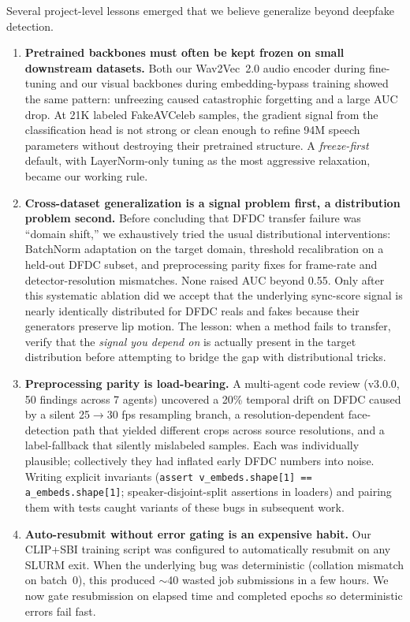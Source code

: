\documentclass[12pt, letterpaper]{article}
\begin{document}
Several project-level lessons emerged that we believe generalize beyond deepfake detection.

\begin{enumerate}[leftmargin=1.5em, itemsep=4pt]
    \item \textbf{Pretrained backbones must often be kept frozen on small downstream datasets.} Both our Wav2Vec~2.0 audio encoder during fine-tuning and our visual backbones during embedding-bypass training showed the same pattern: unfreezing caused catastrophic forgetting and a large AUC drop. At 21K labeled FakeAVCeleb samples, the gradient signal from the classification head is not strong or clean enough to refine 94M speech parameters without destroying their pretrained structure. A \emph{freeze-first} default, with LayerNorm-only tuning as the most aggressive relaxation, became our working rule.
    \item \textbf{Cross-dataset generalization is a signal problem first, a distribution problem second.} Before concluding that DFDC transfer failure was ``domain shift,'' we exhaustively tried the usual distributional interventions: BatchNorm adaptation on the target domain, threshold recalibration on a held-out DFDC subset, and preprocessing parity fixes for frame-rate and detector-resolution mismatches. None raised AUC beyond 0.55. Only after this systematic ablation did we accept that the underlying sync-score signal is nearly identically distributed for DFDC reals and fakes because their generators preserve lip motion. The lesson: when a method fails to transfer, verify that the \emph{signal you depend on} is actually present in the target distribution before attempting to bridge the gap with distributional tricks.
    \item \textbf{Preprocessing parity is load-bearing.} A multi-agent code review (v3.0.0, 50 findings across 7 agents) uncovered a 20\% temporal drift on DFDC caused by a silent 25$\to$30 fps resampling branch, a resolution-dependent face-detection path that yielded different crops across source resolutions, and a label-fallback that silently mislabeled samples. Each was individually plausible; collectively they had inflated early DFDC numbers into noise. Writing explicit invariants (\texttt{assert v\_embeds.shape[1] == a\_embeds.shape[1]}; speaker-disjoint-split assertions in loaders) and pairing them with tests caught variants of these bugs in subsequent work.
    \item \textbf{Auto-resubmit without error gating is an expensive habit.} Our CLIP+SBI training script was configured to automatically resubmit on any SLURM exit. When the underlying bug was deterministic (collation mismatch on batch~0), this produced $\sim$40 wasted job submissions in a few hours. We now gate resubmission on elapsed time and completed epochs so deterministic errors fail fast.

\end{enumerate}
\end{document}
